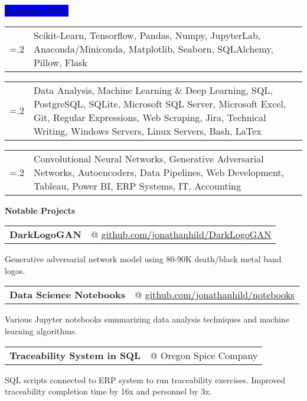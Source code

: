 \documentclass[letterpaper,12pt]{article}[leftmargin=*]
\makeatletter
\newcommand{\skills}[2]{\vspace{4pt}
  \colorbox{Blue}{\color{white}#1\hspace{9pt}\raggedbottom\normalsize\textbf{#2\hspace{4pt}}}
}
\newcommand{\projects}[2]{\vspace{4pt}
  \colorbox{Copper}{\color{white}#1\hspace{9pt}\raggedbottom\normalsize\textbf{#2\hspace{4pt}}}
}
\newcommand{\resumeSectionStart}{\begin{itemize}[leftmargin=0.1in]}
\newcommand{\resumeSectionEnd}{\end{itemize}}
\newcommand{\repo}[2]{\href{#1}{\underline{#2}}}
\newcommand{\resumeProject}[3]{
  \item[]
    \begin{tabularx}{0.97\textwidth}{X@{\hspace{60pt}} r}
      \textbf{\color{primary}#1} & {\color{accent}\small#2} \\
    \end{tabularx}
    {#3}
    \vspace{-6pt}
}
\newcommand{\resumeSkill}[2]{
  \item[]
    \begin{tabularx}{0.97\textwidth}{>{\hsize=.2\hsize}X X }
      {\textbf{#1}} & {\small#2} \\
    \end{tabularx}  
    \vspace{-6pt}

}
\newcommand{\tag}[1]{%
  \tikzmarknode[fill=white,fill opacity=0,draw=subtle!60!subtle,thick,rounded corners,inner sep=0.4ex,text height=1.5ex,text depth=.25ex, text opacity=1]{test}{\hspace{1pt}\small{#1}\hspace{1pt}}
}
\makeatother
\begin{document}
\skills{\faGears}{Technical Skills}

\resumeSectionStart{
  \resumeSkill{Python}{Scikit-Learn, Tensorflow, Pandas, Numpy, JupyterLab, Anaconda/Miniconda, Matplotlib, Seaborn, SQLAlchemy, Pillow, Flask}
  \resumeSkill{Proficient in}{Data Analysis, Machine Learning \& Deep Learning, SQL, PostgreSQL, SQLite, Microsoft SQL Server, Microsoft Excel, Git, Regular Expressions, Web Scraping, Jira, Technical Writing, Windows Servers, Linux Servers, Bash, LaTex}
  \resumeSkill{Familiar with}{Convolutional Neural Networks, Generative Adversarial Networks, Autoencoders, Data Pipelines, Web Development, Tableau, Power BI, ERP Systems, IT, Accounting}
}
\resumeSectionEnd{}

\projects{\faFlask}{Notable Projects}

\resumeSectionStart{
  \resumeProject{DarkLogoGAN}{@ \repo{https://github.com/jonathanhild/DarkLogoGAN}{github.com/jonathanhild/DarkLogoGAN}}{\tag{In Process}Generative adversarial network model using 80-90K death/black metal band logos.}
  \resumeProject{Data Science Notebooks}{@ \repo{https://github.com/jonathanhild/notebooks}{github.com/jonathanhild/notebooks}}{Various Jupyter notebooks summarizing data analysis techniques and machine learning algorithms.}
  \resumeProject{Traceability System in SQL}{@ Oregon Spice Company}{SQL scripts connected to ERP system to run traceability exercises. Improved traceability completion time by 16x and personnel by 3x.}
}
\resumeSectionEnd{}

\end{document}
